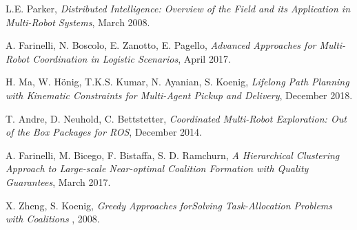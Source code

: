 \begin{thebibliography}{99}
     L.E. Parker, \emph{Distributed Intelligence: Overview of the Field and its
    Application in Multi-Robot Systems}, March 2008.

     A. Farinelli, N. Boscolo, E. Zanotto, E. Pagello,
    \emph{Advanced Approaches for Multi-Robot Coordination in
    Logistic Scenarios}, April 2017.

     H. Ma, W. Hönig, T.K.S. Kumar, N. Ayanian, S. Koenig,
    \emph{Lifelong Path Planning with Kinematic Constraints
    for Multi-Agent Pickup and Delivery}, December 2018.

     T. Andre, D. Neuhold, C. Bettstetter,
    \emph{Coordinated Multi-Robot Exploration:
    Out of the Box Packages for ROS}, December 2014.

     A. Farinelli, M. Bicego, F. Bistaffa, S. D. Ramchurn,
    \emph{A Hierarchical Clustering Approach to Large-scale
    Near-optimal Coalition Formation with Quality
    Guarantees}, March 2017.

     X. Zheng, S. Koenig,
    \emph{Greedy Approaches forSolving Task-Allocation Problems with Coalitions}
    , 2008.
    
\end{thebibliography}